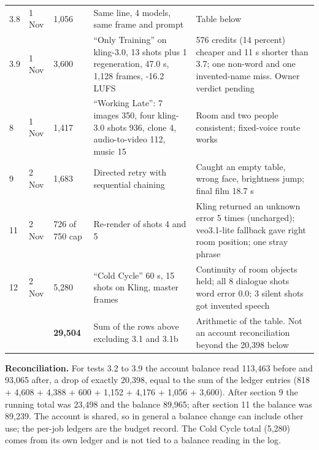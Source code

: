 \documentclass[11pt,a4paper]{article}
\begin{document}
\begin{longtable}{@{}P{0.7cm}P{2.0cm}P{2.1cm}P{4.2cm}P{6.5cm}@{}}
3.8 & 1 Nov & 1,056 & Same line, 4 models, same frame and prompt & Table below\\
3.9 & 1 Nov & 3,600 & ``Only Training'' on kling-3.0, 13 shots plus 1 regeneration, 47.0 s, 1,128 frames, -16.2 LUFS & 576 credits (14 percent) cheaper and 11 s shorter than 3.7; one non-word and one invented-name miss. Owner verdict pending\\
8 & 1 Nov & 1,417 & ``Working Late'': 7 images 350, four kling-3.0 shots 936, clone 4, audio-to-video 112, music 15 & Room and two people consistent; fixed-voice route works\\
9 & 2 Nov & 1,683 & Directed retry with sequential chaining & Caught an empty table, wrong face, brightness jump; final film 18.7 s\\
11 & 2 Nov & 726 of 750 cap & Re-render of shots 4 and 5 & Kling returned an unknown error 5 times (uncharged); veo3.1-lite fallback gave right room position; one stray phrase\\
12 & 2 Nov & 5,280 & ``Cold Cycle'' 60 s, 15 shots on Kling, master frames & Continuity of room objects held; all 8 dialogue shots word error 0.0; 3 silent shots got invented speech\\
\midrule & & \textbf{29,504} & Sum of the rows above excluding 3.1 and 3.1b & Arithmetic of the table. Not an account reconciliation beyond the 20,398 below\\
\bottomrule
\end{longtable}
\textbf{Reconciliation.} For tests 3.2 to 3.9 the account balance read 113,463 before and 93,065 after, a drop of exactly 20,398, equal to the sum of the ledger entries (818 + 4,608 + 4,388 + 600 + 1,152 + 4,176 + 1,056 + 3,600). After section 9 the running total was 23,498 and the balance 89,965; after section 11 the balance was 89,239. The account is shared, so in general a balance change can include other use; the per-job ledgers are the budget record. The Cold Cycle total (5,280) comes from its own ledger and is not tied to a balance reading in the log.
\end{document}
